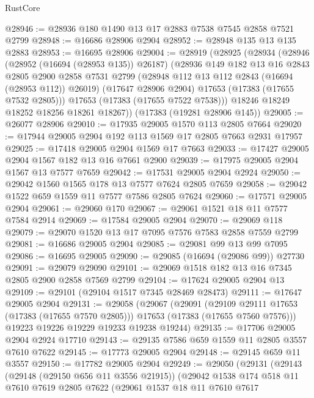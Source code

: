 \begin{lexlean}{RustCore}
\begin{coremodule}
@28946 := @28936 @180 @1490 @13 @17 @2883 @7538 @7545 @2858 @7521 @2799
@28948 := @16686 @28906 @2904
@28952 := @28948 @135 @13 @135 @2883
@28953 := @16695 @28906
@29004 := @28919
    (@28925
      (@28934
        (@28946
          (@28952 (@16694 (@28953 @135)) @26187)
          (@28936
            @149
            @182
            @13
            @16
            @2843
            @2805
            @2900
            @2858
            @7531
            @2799
            (@28948 @112 @13 @112 @2843 (@16694 (@28953 @112)) @26019)
            (@17647 @28906 @2904)
            @17653
            (@17383 (@17655 @7532 @2805)))
          @17653
          (@17383 (@17655 @7522 @7538)))
        @18246
        @18249
        @18252
        @18256
        @18261
        @18267))
    (@17383 (@19281 @28906 @145))
@29005 := @26077 @28906
@29010 := @17935 @29005 @1570 @113 @2805 @7664
@29020 := @17944 @29005 @2904 @192 @113 @1569 @17 @2805 @7663 @2931 @17957
@29025 := @17418 @29005 @2904 @1569 @17 @7663
@29033 := @17427 @29005 @2904 @1567 @182 @13 @16 @7661 @2900
@29039 := @17975 @29005 @2904 @1567 @13 @7577 @7659
@29042 := @17531 @29005 @2904 @2924
@29050 := @29042 @1560 @1565 @178 @13 @7577 @7624 @2805 @7659
@29058 := @29042 @1522 @659 @1559 @11 @7577 @7586 @2805 @7624
@29060 := @17571 @29005 @2904
@29061 := @29060 @170
@29067 := @29061 @1521 @18 @11 @7577 @7584 @2914
@29069 := @17584 @29005 @2904
@29070 := @29069 @118
@29079 := @29070 @1520 @13 @17 @7095 @7576 @7583 @2858 @7559 @2799
@29081 := @16686 @29005 @2904
@29085 := @29081 @99 @13 @99 @7095
@29086 := @16695 @29005
@29090 := @29085 (@16694 (@29086 @99)) @27730
@29091 := @29079 @29090
@29101 := @29069 @1518 @182 @13 @16 @7345 @2805 @2900 @2858 @7569 @2799
@29104 := @17624 @29005 @2904 @13
@29109 := @29101 (@29104 @1517 @7345 @28469 @28473)
@29111 := @17647 @29005 @2904
@29131 := @29058
    (@29067
      (@29091
        (@29109 @29111 @17653 (@17383 (@17655 @7570 @2805)))
        @17653
        (@17383 (@17655 @7560 @7576)))
      @19223
      @19226
      @19229
      @19233
      @19238
      @19244)
@29135 := @17706 @29005 @2904 @2924 @17710
@29143 := @29135 @7586 @659 @1559 @11 @2805 @3557 @7610 @7622
@29145 := @17773 @29005 @2904
@29148 := @29145 @659 @11 @3557
@29150 := @17782 @29005 @2904
@29249 := @29050
    (@29131
      (@29143
        (@29148 (@29150 @656 @11 @3556 @21915))
        (@29042
          @1538
          @174
          @518
          @11
          @7610
          @7619
          @2805
          @7622
          (@29061
            @1537
            @18
            @11
            @7610
            @7617

\end{coremodule}
\end{lexlean}
